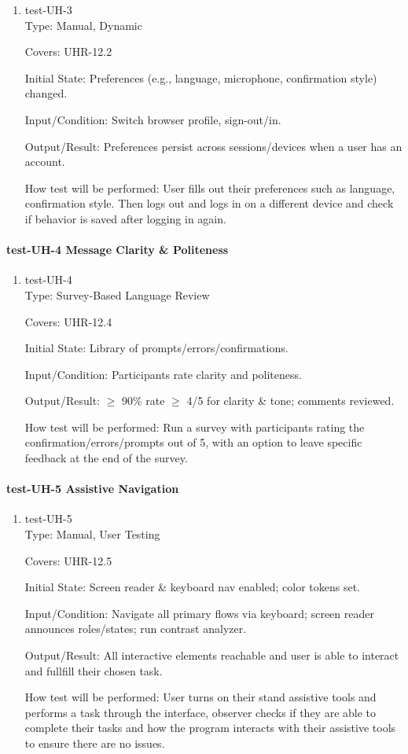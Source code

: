 \documentclass[12pt, titlepage]{article}
\begin{document}
\begin{enumerate}
\item{test-UH-3\\}
Type: Manual, Dynamic

Covers: UHR-12.2

Initial State: Preferences (e.g., language, microphone, confirmation style) changed.

Input/Condition: Switch browser profile, sign-out/in.

Output/Result: Preferences persist across sessions/devices when a user has an account.

How test will be performed: User fills out their preferences such as language, confirmation style. Then logs out and logs in on a different device and check if behavior is saved after logging in again.
\end{enumerate}

\paragraph{test-UH-4 Message Clarity \& Politeness}

\begin{enumerate}
\item{test-UH-4\\}
Type: Survey-Based Language Review

Covers: UHR-12.4

Initial State: Library of prompts/errors/confirmations.

Input/Condition: Participants rate clarity and politeness.

Output/Result: $\geq$ 90\% rate $\geq$ 4/5 for clarity \& tone; comments reviewed.

How test will be performed: Run a survey with participants rating the confirmation/errors/prompts out of 5, with an option to leave specific feedback at the end of the survey.
\end{enumerate}

\paragraph{test-UH-5 Assistive Navigation}

\begin{enumerate}
\item{test-UH-5\\}
Type: Manual, User Testing

Covers: UHR-12.5

Initial State: Screen reader \& keyboard nav enabled; color tokens set.

Input/Condition: Navigate all primary flows via keyboard; screen reader announces roles/states; run contrast analyzer.

Output/Result: All interactive elements reachable and user is able to interact and fullfill their chosen task.

How test will be performed: User turns on their stand assistive tools and performs a task through the interface, observer checks if they are able to complete their tasks and how the program interacts with their assistive tools to ensure there are no issues.
\end{enumerate}
\end{document}
